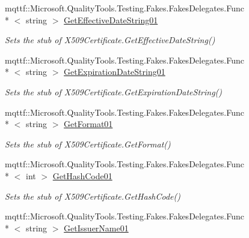 \begin{DoxyCompactItemize}
mqttf\-::\-Microsoft.\-Quality\-Tools.\-Testing.\-Fakes.\-Fakes\-Delegates.\-Func\\*
$<$ string $>$ \hyperlink{class_system_1_1_security_1_1_cryptography_1_1_x509_certificates_1_1_fakes_1_1_stub_x509_certificate_a6d0e2f7d1fe6fb13143f022fd867508d}{Get\-Effective\-Date\-String01}
\begin{DoxyCompactList}\small\item\em Sets the stub of X509\-Certificate.\-Get\-Effective\-Date\-String()\end{DoxyCompactList}\item 
mqttf\-::\-Microsoft.\-Quality\-Tools.\-Testing.\-Fakes.\-Fakes\-Delegates.\-Func\\*
$<$ string $>$ \hyperlink{class_system_1_1_security_1_1_cryptography_1_1_x509_certificates_1_1_fakes_1_1_stub_x509_certificate_aeb92ff854ebf6c9bd1fedf3c2e59102f}{Get\-Expiration\-Date\-String01}
\begin{DoxyCompactList}\small\item\em Sets the stub of X509\-Certificate.\-Get\-Expiration\-Date\-String()\end{DoxyCompactList}\item 
mqttf\-::\-Microsoft.\-Quality\-Tools.\-Testing.\-Fakes.\-Fakes\-Delegates.\-Func\\*
$<$ string $>$ \hyperlink{class_system_1_1_security_1_1_cryptography_1_1_x509_certificates_1_1_fakes_1_1_stub_x509_certificate_a876a26997492042094a69300696533e4}{Get\-Format01}
\begin{DoxyCompactList}\small\item\em Sets the stub of X509\-Certificate.\-Get\-Format()\end{DoxyCompactList}\item 
mqttf\-::\-Microsoft.\-Quality\-Tools.\-Testing.\-Fakes.\-Fakes\-Delegates.\-Func\\*
$<$ int $>$ \hyperlink{class_system_1_1_security_1_1_cryptography_1_1_x509_certificates_1_1_fakes_1_1_stub_x509_certificate_add51554878e96465b83736e88f6c188c}{Get\-Hash\-Code01}
\begin{DoxyCompactList}\small\item\em Sets the stub of X509\-Certificate.\-Get\-Hash\-Code()\end{DoxyCompactList}\item 
mqttf\-::\-Microsoft.\-Quality\-Tools.\-Testing.\-Fakes.\-Fakes\-Delegates.\-Func\\*
$<$ string $>$ \hyperlink{class_system_1_1_security_1_1_cryptography_1_1_x509_certificates_1_1_fakes_1_1_stub_x509_certificate_a599e0e319b2a130759633cc3db47e625}{Get\-Issuer\-Name01}

\end{DoxyCompactItemize}
